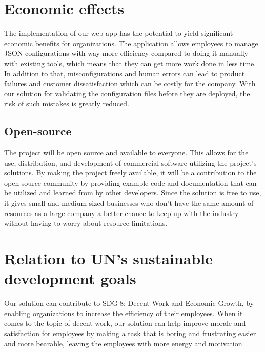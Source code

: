 
\section{Economic effects}

\noindent
The implementation of our web app has the potential to yield significant economic benefits for organizations. The application allows employees to manage JSON configurations with way more efficiency compared to doing it manually with existing tools, which means that they can get more work done in less time. In addition to that, misconfigurations and human errors can lead to product failures and customer dissatisfaction which can be costly for the company. With our solution for validating the configuration files before they are deployed, the risk of such mistakes is greatly reduced. 

\subsection{Open-source}

The project will be open source and available to everyone. This allows for the use, distribution, and development of commercial software utilizing the project's solutions. By making the project freely available, it will be a contribution to the open-source community by providing example code and documentation that can be utilized and learned from by other developers. Since the solution is free to use, it gives small and medium sized businesses who don't have the same amount of resources as a large company a better chance to keep up with the industry without having to worry about resource limitations. \\

\section{Relation to UN's sustainable development goals}

\noindent
Our solution can contribute to SDG 8: Decent Work and Economic Growth, by enabling organizations to increase the efficiency of their employees. When it comes to the topic of decent work, our solution can help improve morale and satisfaction for employees by making a task that is boring and frustrating easier and more bearable, leaving the employees with more energy and motivation. \cite{unitednations_SGD8}


